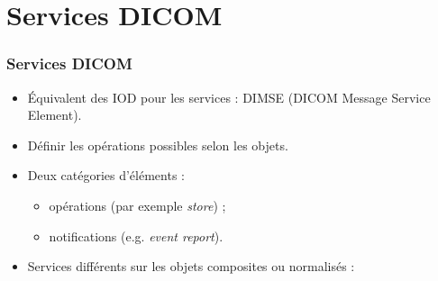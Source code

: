 \section{Services DICOM}

\frame
{
	\frametitle{Services DICOM}
	
	\begin{itemize}
		\item<1-> \'Equivalent des IOD pour les services : DIMSE (DICOM Message Service Element).
		\item<2-> D\'efinir les op\'erations possibles selon les objets.
		\item<3-> Deux cat\'egories d'\'el\'ements :
		\begin{itemize}
			\item<4-> op\'erations (par exemple \emph{store}) ;
			\item<5-> notifications (e.g. \emph{event report}).
		\end{itemize}
		\item<6-> Services diff\'erents sur les objets composites ou normalis\'es :
	\end{itemize}
}

